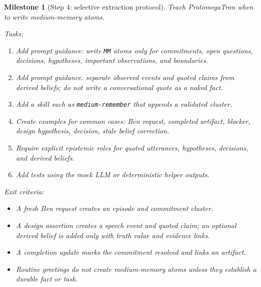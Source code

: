 \documentclass[11pt]{article}
\newtheorem{milestone}{Milestone}
\begin{document}
\begin{milestone}[Step 4: selective extraction protocol]
Teach ProtomegaTron when to write medium-memory atoms.

Tasks:
\begin{enumerate}
  \item Add prompt guidance: write \texttt{MM} atoms only for commitments, open
        questions, decisions, hypotheses, important observations, and boundaries.
  \item Add prompt guidance: separate observed events and quoted claims from derived
        beliefs; do not write a conversational quote as a naked fact.
  \item Add a skill such as \texttt{medium-remember} that appends a validated cluster.
  \item Create examples for common cases: Ben request, completed artifact, blocker,
        design hypothesis, decision, stale belief correction.
  \item Require explicit epistemic roles for quoted utterances, hypotheses, decisions,
        and derived beliefs.
  \item Add tests using the mock LLM or deterministic helper outputs.
\end{enumerate}

Exit criteria:
\begin{itemize}
  \item A fresh Ben request creates an episode and commitment cluster.
  \item A design assertion creates a speech event and quoted claim; an optional
        derived belief is added only with truth value and evidence links.
  \item A completion update marks the commitment resolved and links an artifact.
  \item Routine greetings do not create medium-memory atoms unless they establish
        a durable fact or task.
\end{itemize}
\end{milestone}
\end{document}
